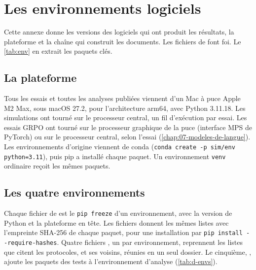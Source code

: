 \chapter{Les environnements logiciels}
\label{chap:D-environnements}

Cette annexe donne les versions des logiciels qui ont produit les résultats, la plateforme et la
chaîne qui construit les documents. Les fichiers de  font foi. Le \cref{tab:env} en
extrait les paquets clés.

\section{La plateforme}
\label{sec:d-plateforme}

Tous les essais et toutes les analyses publiées viennent d'un Mac à puce Apple M2 Max, sous macOS 27.2,
pour l'architecture arm64, avec Python 3.11.18. Les simulations ont tourné sur le processeur central,
un fil d'exécution par essai. Les essais GRPO ont tourné sur le processeur graphique de la puce
(interface MPS de PyTorch) ou sur le processeur central, selon l'essai
(\cref{chap:07-modeles-de-langue}). Les environnements d'origine viennent de conda
(\texttt{conda create -p sim/env python=3.11}), puis pip a installé chaque paquet. Un environnement
\texttt{venv} ordinaire reçoit les mêmes paquets.

\section{Les quatre environnements}
\label{sec:d-envs}

Chaque fichier de  est le \texttt{pip freeze} d'un environnement, avec la
version de Python et la plateforme en tête. Les fichiers  donnent les mêmes listes avec
l'empreinte SHA-256 de chaque paquet, pour une installation par \texttt{pip install
-{}-require-hashes}. Quatre fichiers , un par environnement, reprennent les listes que
citent les protocoles,  et ses voisins, réunies en un seul dossier. Le
cinquième, , ajoute les paquets des tests à l'environnement d'analyse
(\cref{tab:d-envs}).

